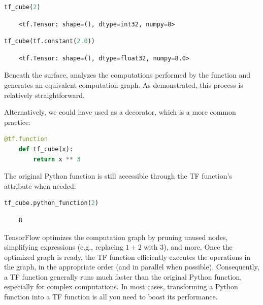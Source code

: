 \begin{lstlisting}[language=Python, numbers=none, caption={Using the TensorFlow function}]
	tf_cube(2)
\end{lstlisting}
\begin{verbatim}
	<tf.Tensor: shape=(), dtype=int32, numpy=8>
\end{verbatim}

\begin{lstlisting}[language=Python, numbers=none, caption={Using the TensorFlow function with a tensor}]
	tf_cube(tf.constant(2.0))
\end{lstlisting}
\begin{verbatim}
	<tf.Tensor: shape=(), dtype=float32, numpy=8.0>
\end{verbatim}

Beneath the surface,  analyzes the computations performed by the  function and generates an equivalent computation graph. As demonstrated, this process is relatively straightforward.

Alternatively, we could have used  as a decorator, which is a more common practice:

\begin{lstlisting}[language=Python, numbers=none, caption={Using tf.function as a decorator}]
	@tf.function
	def tf_cube(x):
		return x ** 3
\end{lstlisting}

The original Python function is still accessible through the TF function’s  attribute when needed:

\begin{lstlisting}[language=Python, numbers=none, caption={Accessing the original Python function}]
	tf_cube.python_function(2)
\end{lstlisting}

\begin{verbatim}
	8
\end{verbatim}

TensorFlow optimizes the computation graph by pruning unused nodes, simplifying expressions (e.g., replacing \(1 + 2\) with \(3\)), and more. Once the optimized graph is ready, the TF function efficiently executes the operations in the graph, in the appropriate order (and in parallel when possible). Consequently, a TF function generally runs much faster than the original Python function, especially for complex computations. In most cases, transforming a Python function into a TF function is all you need to boost its performance.



